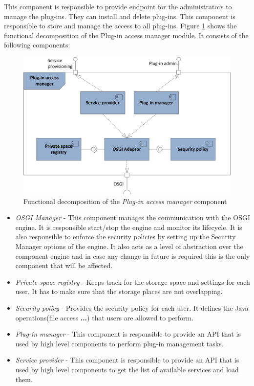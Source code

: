 This component is responsible to provide endpoint for the administrators to manage the plug-ins. They can install and delete plug-ins. This component is responsible to store and manage the access to all plug-ins. Figure \ref{fig_access_func} shows the functional decomposition of the Plug-in access manager module. It consists of the following components:


\begin{figure}[h!]
  \centering
  	\includegraphics[scale=0.85]{plug-in/layers/access-func.png}
  \caption{Functional decomposition of the \textit{Plug-in access manager} component}
  \label{fig_access_func}
\end{figure}

\begin{itemize}

\item \textit{OSGI Manager} - This component manages the communication with the OSGI engine. It is responsible start/stop the engine and monitor its lifecycle. It is also responsible to enforce the security policies by setting up the Security Manager options of the engine. It also acts as a level of abstraction over the component engine and in case any change in future is required this is the only component that will be affected. 

\item \textit{Private space registry} - Keeps track for the storage space and settings for each user. It has to make sure that the storage places are not overlapping.  

\item \textit{Security policy} - Provides the security policy for each user. It defines the Java operations(file access \textbf{...}) that users are allowed to perform.

\item \textit{Plug-in manager} - This component is responsible to provide an API that is used by high level components to perform plug-in management tasks.

\item \textit{Service provider} - This component is responsible to provide an API that is used by high level components to get the list of available services and load them.

\end{itemize}

